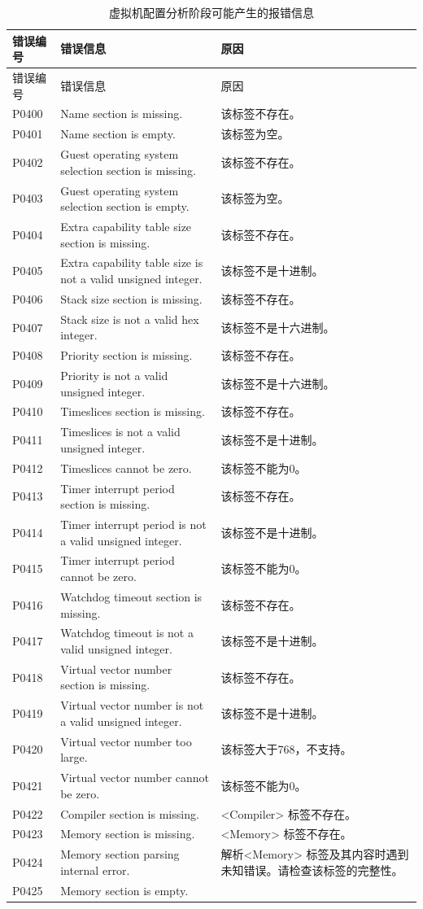 \begin{xltabular}{\textwidth}{@{}>{\hsize\raggedright\arraybackslash}X>{\hsize\raggedright\arraybackslash}X>{\hsize\raggedright\arraybackslash}X@{}}
\caption{虚拟机配置分析阶段可能产生的报错信息}\label{tab:5-7}\\
\toprule
错误编号 & 错误信息 & 原因\tabularnewline
\endfirsthead
\toprule
错误编号 & 错误信息 & 原因\tabularnewline
\midrule
\endhead
\bottomrule
\endlastfoot
P0400 & Name section is missing. & 该标签不存在。\tabularnewline
P0401 & Name section is empty. & 该标签为空。\tabularnewline
P0402 & Guest operating system selection section is missing. & 该标签不存在。\tabularnewline
P0403 & Guest operating system selection section is empty. & 该标签为空。\tabularnewline
P0404 & Extra capability table size section is missing. & 该标签不存在。\tabularnewline
P0405 & Extra capability table size is not a valid unsigned integer. &
该标签不是十进制。\tabularnewline
P0406 & Stack size section is missing. & 该标签不存在。\tabularnewline
P0407 & Stack size is not a valid hex integer. & 该标签不是十六进制。\tabularnewline
P0408 & Priority section is missing. & 该标签不存在。\tabularnewline
P0409 & Priority is not a valid unsigned integer. & 该标签不是十六进制。\tabularnewline
P0410 & Timeslices section is missing. & 该标签不存在。\tabularnewline
P0411 & Timeslices is not a valid unsigned integer. & 该标签不是十进制。\tabularnewline
P0412 & Timeslices cannot be zero. & 该标签不能为0。\tabularnewline
P0413 & Timer interrupt period section is missing. & 该标签不存在。\tabularnewline
P0414 & Timer interrupt period is not a valid unsigned integer. & 该标签不是十进制。\tabularnewline
P0415 & Timer interrupt period cannot be zero. & 该标签不能为0。\tabularnewline
P0416 & Watchdog timeout section is missing. & 该标签不存在。\tabularnewline
P0417 & Watchdog timeout is not a valid unsigned integer. & 该标签不是十进制。\tabularnewline
P0418 & Virtual vector number section is missing. & 该标签不存在。\tabularnewline
P0419 & Virtual vector number is not a valid unsigned integer. & 该标签不是十进制。\tabularnewline
P0420 & Virtual vector number too large. & 该标签大于768，不支持。\tabularnewline
P0421 & Virtual vector number cannot be zero. & 该标签不能为0。\tabularnewline
P0422 & Compiler section is missing. &
<Compiler> 标签不存在。\tabularnewline
P0423 & Memory section is missing. &
<Memory> 标签不存在。\tabularnewline
P0424 & Memory section parsing internal error. &
解析<Memory> 标签及其内容时遇到未知错误。请检查该标签的完整性。\tabularnewline
P0425 & Memory section is empty. &

\end{xltabular}
